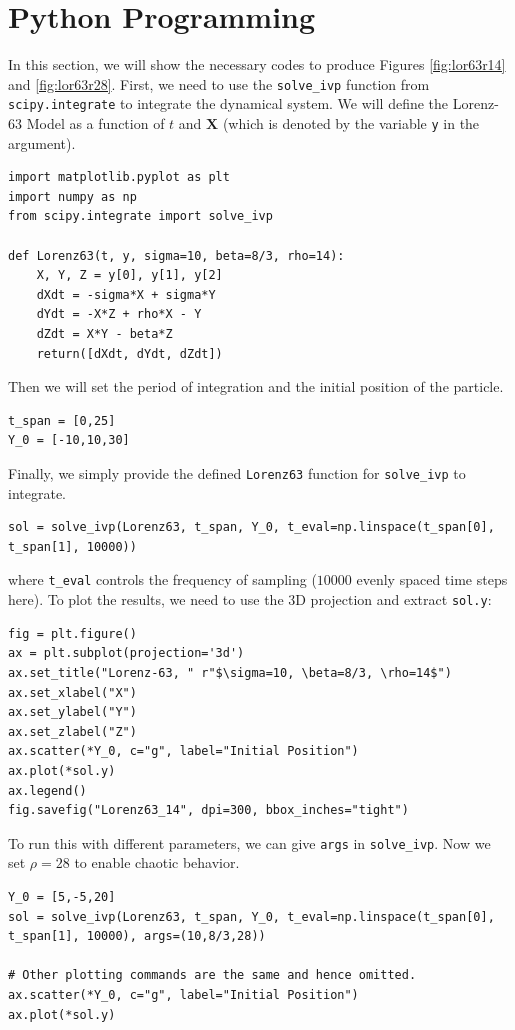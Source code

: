 \section{Python Programming}

In this section, we will show the necessary codes to produce Figures \ref{fig:lor63r14} and \ref{fig:lor63r28}. First, we need to use the \verb|solve_ivp| function from \verb|scipy.integrate| to integrate the dynamical system. We will define the Lorenz-63 Model as a function of $t$ and $\textbf{X}$ (which is denoted by the variable \verb|y| in the argument).
\begin{lstlisting}
import matplotlib.pyplot as plt
import numpy as np
from scipy.integrate import solve_ivp

def Lorenz63(t, y, sigma=10, beta=8/3, rho=14):
    X, Y, Z = y[0], y[1], y[2]
    dXdt = -sigma*X + sigma*Y
    dYdt = -X*Z + rho*X - Y
    dZdt = X*Y - beta*Z
    return([dXdt, dYdt, dZdt])
\end{lstlisting}
Then we will set the period of integration and the initial position of the particle.
\begin{lstlisting}
t_span = [0,25]
Y_0 = [-10,10,30]
\end{lstlisting}
Finally, we simply provide the defined \verb|Lorenz63| function for \verb|solve_ivp| to integrate.
\begin{lstlisting}
sol = solve_ivp(Lorenz63, t_span, Y_0, t_eval=np.linspace(t_span[0], t_span[1], 10000))
\end{lstlisting}
where \verb|t_eval| controls the frequency of sampling ($10000$ evenly spaced time steps here). To plot the results, we need to use the 3D projection and extract \verb|sol.y|:
\begin{lstlisting}
fig = plt.figure()
ax = plt.subplot(projection='3d')
ax.set_title("Lorenz-63, " r"$\sigma=10, \beta=8/3, \rho=14$")
ax.set_xlabel("X")
ax.set_ylabel("Y")
ax.set_zlabel("Z")
ax.scatter(*Y_0, c="g", label="Initial Position")
ax.plot(*sol.y)
ax.legend()
fig.savefig("Lorenz63_14", dpi=300, bbox_inches="tight")    
\end{lstlisting}
To run this with different parameters, we can give \verb|args| in \verb|solve_ivp|. Now we set $\rho = 28$ to enable chaotic behavior.
\begin{lstlisting}
Y_0 = [5,-5,20]
sol = solve_ivp(Lorenz63, t_span, Y_0, t_eval=np.linspace(t_span[0], t_span[1], 10000), args=(10,8/3,28))

# Other plotting commands are the same and hence omitted.
ax.scatter(*Y_0, c="g", label="Initial Position")
ax.plot(*sol.y)
\end{lstlisting}
